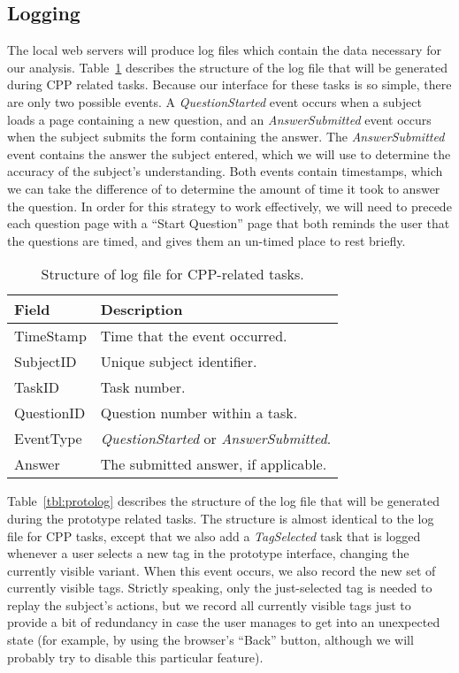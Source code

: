 \documentclass[11pt]{article}
\newcommand{\event}[1]{\textit{#1}}
\begin{document}
\subsection{Logging}
\label{sec:logging}

The local web servers will produce log files which contain the data necessary
for our analysis.  Table~\ref{tbl:cpplog} describes the structure of the log
file that will be generated during CPP related tasks.  Because our interface
for these tasks is so simple, there are only two possible events.  A
\event{QuestionStarted} event occurs when a subject loads a page containing a
new question, and an \event{AnswerSubmitted} event occurs when the subject
submits the form containing the answer.  The \event{AnswerSubmitted} event
contains the answer the subject entered, which we will use to determine the
accuracy of the subject's understanding.  Both events contain timestamps, which
we can take the difference of to determine the amount of time it took to answer
the question.  In order for this strategy to work effectively, we will need to
precede each question page with a ``Start Question'' page that both reminds the
user that the questions are timed, and gives them an un-timed place to rest
briefly.

\begin{table}
\centering
\begin{tabular}{|l | p{}|}
\hline
\textbf{Field} & \textbf{Description} \\
\hline
TimeStamp  & Time that the event occurred. \\
SubjectID  & Unique subject identifier. \\
TaskID     & Task number. \\
QuestionID & Question number within a task. \\
EventType  & \event{QuestionStarted} or \event{AnswerSubmitted}. \\
Answer     & The submitted answer, if applicable. \\
\hline
\end{tabular}
\caption{Structure of log file for CPP-related tasks.}
\label{tbl:cpplog}
\end{table}

Table~\ref{tbl:protolog} describes the structure of the log file that will be
generated during the prototype related tasks.  The structure is almost
identical to the log file for CPP tasks, except that we also add a
\event{TagSelected} task that is logged whenever a user selects a new tag in
the prototype interface, changing the currently visible variant.  When this
event occurs, we also record the new set of currently visible tags.  Strictly
speaking, only the just-selected tag is needed to replay the subject's actions,
but we record all currently visible tags just to provide a bit of redundancy in
case the user manages to get into an unexpected state (for example, by using
the browser's ``Back'' button, although we will probably try to disable this
particular feature).
\end{document}
